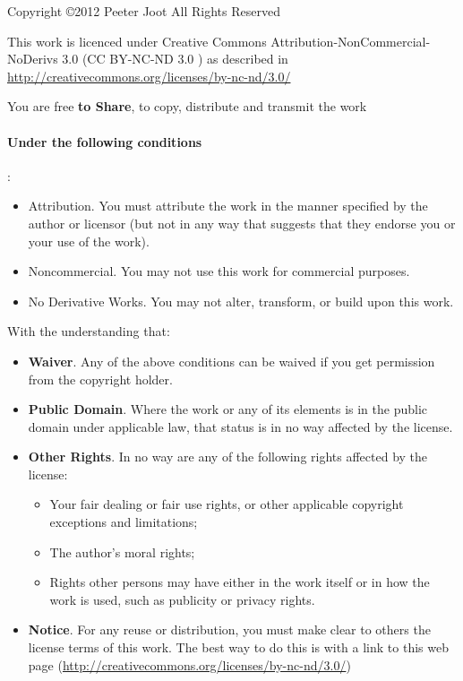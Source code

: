 Copyright \copyright 2012 Peeter Joot
All Rights Reserved

This work is licenced under Creative Commons Attribution-NonCommercial-NoDerivs 3.0 (CC BY-NC-ND 3.0 \ccbyncnd) as described in \href{http://creativecommons.org/licenses/by-nc-nd/3.0/}{http://creativecommons.org/licenses/by-nc-nd/3.0/}

You are free \textbf{to Share}, to copy, distribute and transmit the work

\paragraph{Under the following conditions}:

\begin{itemize}
\item \ccAttribution Attribution.  You must attribute the work in the manner specified by the author or licensor (but not in any way that suggests that they endorse you or your use of the work).
\item \ccNonCommercial Noncommercial. You may not use this work for commercial purposes.
\item \ccNoDerivatives No Derivative Works. You may not alter, transform, or build upon this work.
\end{itemize}

With the understanding that:

\begin{itemize}
\item \textbf{Waiver}. Any of the above conditions can be waived if you get permission from the copyright holder.
\item \textbf{Public Domain}. Where the work or any of its elements is in the public domain under applicable law, that status is in no way affected by the license.
\item \textbf{Other Rights}. In no way are any of the following rights affected by the license:

\begin{itemize}
\item Your fair dealing or fair use rights, or other applicable copyright exceptions and limitations;
\item The author's moral rights;
\item Rights other persons may have either in the work itself or in how the work is used, such as publicity or privacy rights.
\end{itemize}

\item \textbf{Notice}. For any reuse or distribution, you must make clear to others the license terms of this work. The best way to do this is with a link to this web page (\href{http://creativecommons.org/licenses/by-nc-nd/3.0/}{http://creativecommons.org/licenses/by-nc-nd/3.0/})
\end{itemize}
